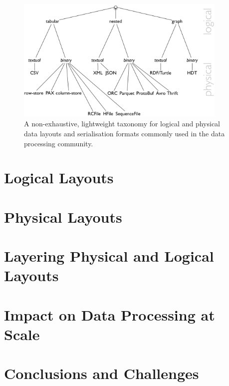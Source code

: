 \documentclass{llncs}
\begin{document}
\begin{figure}[h!]
\centering
\includegraphics[width=0.9\textwidth]{taxonomy-dl}
\caption{A non-exhaustive, lightweight taxonomy for logical and physical data layouts and 
serialisation formats commonly used in the data processing community.}
\label{fig:taxonomy-dl}
\end{figure}

\section{Logical Layouts}
\label{sec:loglay}

\section{Physical Layouts}
\label{sec:phylay}

\section{Layering Physical and Logical Layouts}
\label{sec:laylay}


\section{Impact on Data Processing at Scale}
\label{sec:ldp}


\section{Conclusions and Challenges}
\label{sec:concl}




\end{document}
